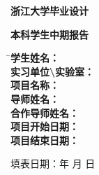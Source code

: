 \newpage
\thispagestyle{empty}

\vspace{4cm}

\centerline{\heiti\erhao\textbf{浙江大学毕业设计}}
\centerline{\heiti\yihao\textbf{本科学生中期报告}}

\vspace{4cm}

\begin{tabbing}
    \= \songti\sanhao \textbf{学生姓名：}\quad \quad \quad \quad \=      \underline{\makebox[8cm]{\sanhao\textbf{\zjuauthornamec}}} \\[2mm]
    \> \songti\sanhao \textbf{实习单位\textbackslash 实验室：}\> \underline{\makebox[8cm]{\sanhao\textbf{\zjuworkplacec}}} \\[2mm]
    \> \songti\sanhao \textbf{项目名称：}\>      \underline{\makebox[8cm]{\sanhao\textbf{\zjutitlec}}} \\[2mm]
    \> \songti\sanhao \textbf{导师姓名：}\>      \underline{\makebox[8cm]{\sanhao\textbf{\zjumentorc}}} \\[2mm]
    \> \songti\sanhao \textbf{合作导师姓名：}\>  \underline{\makebox[8cm]{\sanhao\textbf{\zjuworkmentorc}}} \\[2mm]
    \> \songti\sanhao \textbf{项目开始日期：}\>  \underline{\makebox[8cm]{\sanhao\textbf{\zjuworkbegintime}}} \\[2mm]
    \> \songti\sanhao \textbf{项目结束日期：}\>  \underline{\makebox[8cm]{\sanhao\textbf{\zjuworkendtime}}}
\end{tabbing}

\vspace{6cm}
\begin{center}
\songti\xiaosan 填表日期：\quad 年 \quad 月 \quad 日
\end{center}

